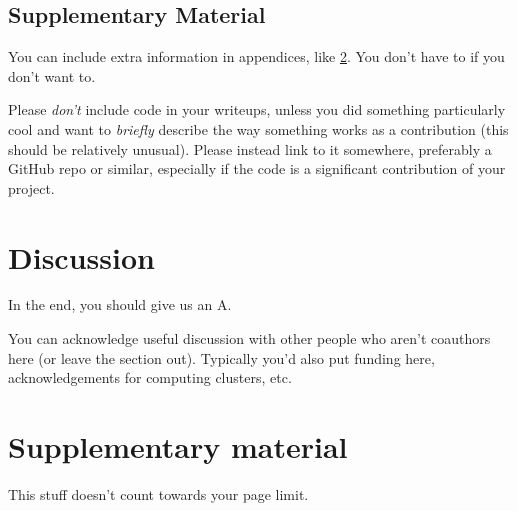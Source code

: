 \documentclass{article}
\begin{document}
\subsection{Supplementary Material}
You can include extra information in appendices, like \cref{app:info}.
You don't have to if you don't want to.

Please \emph{don't} include code in your writeups, unless you did something particularly cool and want to \emph{briefly} describe the way something works as a contribution (this should be relatively unusual).
Please instead link to it somewhere, preferably a GitHub repo or similar,
especially if the code is a significant contribution of your project.


\section{Discussion}
In the end, you should give us an A.


\begin{ack}
    You can acknowledge useful discussion with other people who aren't coauthors here (or leave the section out).
    Typically you'd also put funding here, acknowledgements for computing clusters, etc.
\end{ack}


\printbibliography



\appendix

\section{Supplementary material} \label{app:info}

This stuff doesn't count towards your page limit.
\end{document}
